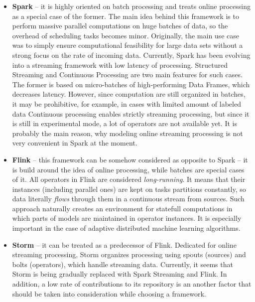 \documentclass[journal]{IEEEtran}
\begin{document}
\medskip
\begin{itemize}
	
	\item \textbf{Spark} -- it is highly oriented on batch processing and treats online processing as a special case of the former. The main idea behind this framework is to perform massive parallel computations on huge batches of data, so the overhead of scheduling tasks becomes minor. Originally, the main use case was to simply ensure computational feasibility for large data sets without a strong focus on the rate of incoming data. Currently, Spark has been evolving into a streaming framework with low latency of processing. Structured Streaming and Continuous Processing are two main features for such cases. The former is based on micro-batches of high-performing Data Frames, which decreases latency. However, since computation are still organized in batches, it may be prohibitive, for example, in cases with limited amount of labeled data Continuous processing enables strictly streaming processing, but since it is still in experimental mode, a lot of operators are not available yet. It is probably the main reason, why modeling online streaming processing is not very convenient in Spark at the moment. 
	\\
	\item \textbf{Flink} -- this framework can be somehow considered as opposite to Spark -- it is build around the idea of online processing, while batches are special cases of it. All operators in Flink are considered \textit{long-running}. It means that their instances (including parallel ones) are kept on tasks partitions constantly, so data literally \textit{flows} through them in a continuous stream from sources. Such approach naturally creates an environment for statefull computations in which parts of models are maintained in operator instances. It is especially important in the case of adaptive distributed machine learning algorithms.
	\\
	\item \textbf{Storm} -- it can be treated as a predecessor of Flink. Dedicated for online streaming processing, Storm organizes processing using spouts (sources) and bolts (operators), which handle streaming data. Currently, it seems that Storm is being gradually replaced with Spark Streaming and Flink. In addition, a low rate of contributions to its repository is an another factor that should be taken into consideration while choosing a framework.
	
\end{itemize}
\end{document}
